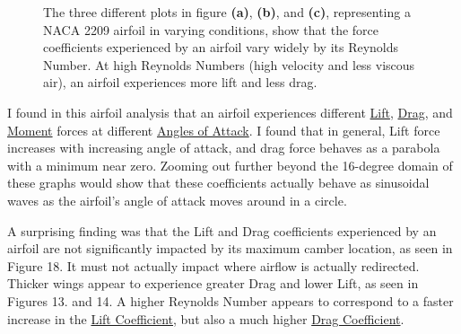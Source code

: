 \documentclass{article}
\begin{document}
\begin{figure}[!htb]
  \centering
  \caption{The three different plots in figure \textbf{(a)}, \textbf{(b)}, and \textbf{(c)}, representing a NACA 2209 airfoil in varying conditions, show that the force coefficients experienced by an airfoil vary widely by its Reynolds Number. At high Reynolds Numbers (high velocity and less viscous air), an airfoil experiences more lift and less drag.}
  \label{fig:8}
\end{figure}

I found in this airfoil analysis that an airfoil experiences different \hyperlink{CL}{Lift}, \hyperlink{CL}{Drag}, and \hyperlink{CM}{Moment} forces at different \hyperlink{alpha}{Angles of Attack}. I found that in general, Lift force increases with increasing angle of attack, and drag force behaves as a parabola with a minimum near zero. Zooming out further beyond the 16-degree domain of these graphs would show that these coefficients actually behave as sinusoidal waves as the airfoil's angle of attack moves around in a circle.\newline

A surprising finding was that the Lift and Drag coefficients experienced by an airfoil are not significantly impacted by its maximum camber location, as seen in Figure 18. It must not actually impact where airflow is actually redirected. Thicker wings appear to experience greater Drag and lower Lift, as seen in Figures 13. and 14. A higher Reynolds Number appears to correspond to a faster increase in the \hyperlink{CL}{Lift Coefficient}, but also a much higher \hyperlink{CD}{Drag Coefficient}. \newline
\end{document}
